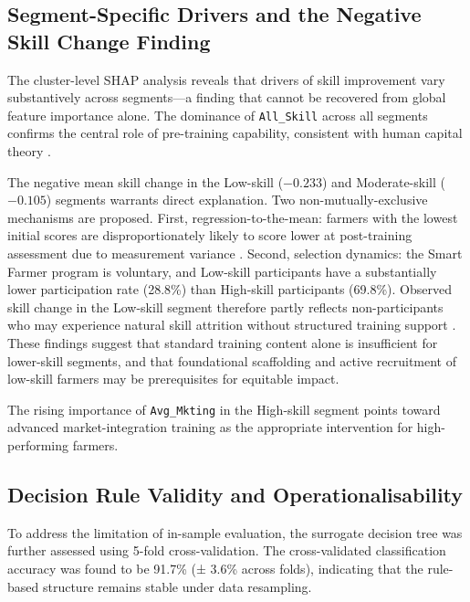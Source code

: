 \documentclass[3p,twocolumn,authoryear]{elsarticle}
\begin{document}
\subsection{Segment-Specific Drivers and the Negative Skill Change
            Finding}

The cluster-level SHAP analysis reveals that drivers of skill improvement
vary substantively across segments---a finding that cannot be recovered
from global feature importance alone.
The dominance of \texttt{All\_Skill} across all segments confirms the
central role of pre-training capability, consistent with human capital
theory \citep{feder1985,davis2012}.

The negative mean skill change in the Low-skill ($-0.233$) and
Moderate-skill ($-0.105$) segments warrants direct explanation.
Two non-mutually-exclusive mechanisms are proposed.
First, regression-to-the-mean: farmers with the lowest initial scores
are disproportionately likely to score lower at post-training assessment
due to measurement variance \citep{davis2012}.
Second, selection dynamics: the Smart Farmer program is voluntary, and
Low-skill participants have a substantially lower participation rate
(28.8\%) than High-skill participants (69.8\%).
Observed skill change in the Low-skill segment therefore partly reflects
non-participants who may experience natural skill attrition without
structured training support \citep{anderson2004}.
These findings suggest that standard training content alone is
insufficient for lower-skill segments, and that foundational scaffolding
and active recruitment of low-skill farmers may be prerequisites for
equitable impact.

The rising importance of \texttt{Avg\_Mkting} in the High-skill segment
points toward advanced market-integration training as the appropriate
intervention for high-performing farmers.

\subsection{Decision Rule Validity and Operationalisability}

To address the limitation of in-sample evaluation, the surrogate decision
tree was further assessed using 5-fold cross-validation. 
The cross-validated classification accuracy was found to be
91.7\% (± 3.6\% across folds), indicating that the rule-based structure
remains stable under data resampling.
\end{document}
